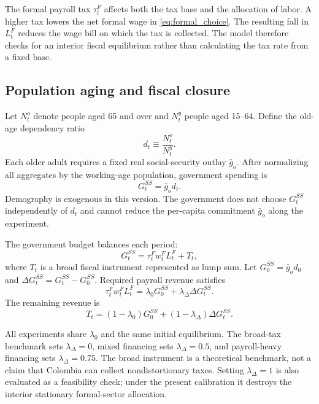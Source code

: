 \documentclass[12pt]{article}
\begin{document}
The formal payroll tax $\tau_t^F$ affects both the tax base and the allocation
of labor. A higher tax lowers the net formal wage in
\eqref{eq:formal_choice}. The resulting fall in $L_t^F$ reduces the wage bill
on which the tax is collected. The model therefore checks for an interior
fiscal equilibrium rather than calculating the tax rate from a fixed base.

\subsection{Population aging and fiscal closure}

Let $N_t^o$ denote people aged 65 and over and $N_t^y$ people aged 15--64.
Define the old-age dependency ratio
\begin{equation}
  d_t\equiv\frac{N_t^o}{N_t^y}.
  \label{eq:dependency}
\end{equation}
Each older adult requires a fixed real social-security outlay $\bar g_o$.
After normalizing all aggregates by the working-age population, government
spending is
\begin{equation}
  G_t^{SS}=\bar g_o d_t.
  \label{eq:social_spending}
\end{equation}
Demography is exogenous in this version. The government does not choose
$G_t^{SS}$ independently of $d_t$ and cannot reduce the per-capita commitment
$\bar g_o$ along the experiment.

The government budget balances each period:
\begin{equation}
  G_t^{SS}=\tau_t^F w_t^F L_t^F+T_t,
  \label{eq:government_budget}
\end{equation}
where $T_t$ is a broad fiscal instrument represented as lump sum. Let
$G_0^{SS}=\bar g_o d_0$ and
$\Delta G_t^{SS}=G_t^{SS}-G_0^{SS}$. Required payroll revenue satisfies
\begin{equation}
  \tau_t^F w_t^F L_t^F
  =
  \lambda_0G_0^{SS}
  +\lambda_\Delta\Delta G_t^{SS}.
  \label{eq:payroll_finance}
\end{equation}
The remaining revenue is
\begin{equation}
  T_t=(1-\lambda_0)G_0^{SS}
  +(1-\lambda_\Delta)\Delta G_t^{SS}.
  \label{eq:lump_sum_finance}
\end{equation}

All experiments share $\lambda_0$ and the same initial equilibrium. The
broad-tax benchmark sets $\lambda_\Delta=0$, mixed financing sets
$\lambda_\Delta=0.5$, and payroll-heavy financing sets
$\lambda_\Delta=0.75$. The broad instrument is a theoretical benchmark, not a
claim that Colombia can collect nondistortionary taxes. Setting
$\lambda_\Delta=1$ is also evaluated as a feasibility check; under the present
calibration it destroys the interior stationary formal-sector allocation.
\end{document}
